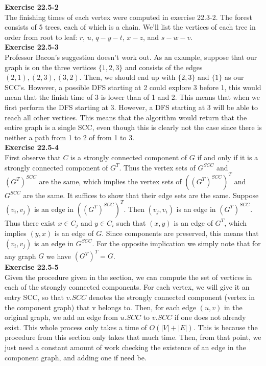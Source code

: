 \documentclass{article}
\begin{document}
\noindent\textbf{Exercise 22.5-2}\\

The finishing times of each vertex were computed in exercise 22.3-2.  The forest consists of 5 trees, each of which is a chain.  We'll list the vertices of each tree in order from root to leaf: $r$, $u$, $q-y-t$, $x-z$, and $s-w-v$.\\

\noindent\textbf{Exercise 22.5-3}\\

Professor Bacon's suggestion doesn't work out. As an example, suppose that our graph is on the three vertices $\{1,2,3\}$ and consists of the edges $(2,1),(2,3),(3,2)$. Then, we should end up with $\{2,3\}$ and $\{1\}$ as our SCC's. However, a possible DFS starting at 2 could explore 3 before 1, this would mean that the finish time of 3 is lower than of 1 and 2. This means that when we first perform the DFS starting at 3. However, a DFS starting at 3 will be able to reach all other vertices. This means that the algorithm would return that the entire graph is a single SCC, even though this is clearly not the case since there is neither a path from 1 to 2 of from 1 to 3.\\

\noindent\textbf{Exercise 22.5-4}\\

First observe that $C$ is a strongly connected component of $G$ if and only if it is a strongly connected component of $G^T$.  Thus the vertex sets of $G^{SCC}$ and $(G^{T})^{SCC}$ are the same, which implies the vertex sets of $((G^T)^{SCC})^T$ and $G^{SCC}$ are the same.  It suffices to show that their edge sets are the same.  Suppose $(v_i, v_j)$ is an edge in $((G^T)^{SCC})^T$.  Then $(v_j, v_i)$ is an edge in $(G^{T})^{SCC}$.  Thus there exist $x \in C_j$ and $y \in C_i$ such that $(x,y)$ is an edge of $G^T$, which implies $(y,x)$ is an edge of $G$.  Since components are preserved, this means that $(v_i, v_j)$ is an edge in $G^{SCC}$.  For the opposite implication we simply note that for any graph $G$ we have $(G^T)^T = G$. \\

\noindent\textbf{Exercise 22.5-5}\\

Given the procedure given in the section, we can compute the set of vertices in each of the strongly connected components. For each vertex, we will give it an entry SCC, so that $v.SCC$ denotes the strongly connected component (vertex in the component graph) that v belongs to. Then, for each edge $(u,v)$ in the original graph, we add an edge from $u.SCC$ to $v.SCC$ if one does not already exist. This whole process only takes a time of $O(|V|+|E|)$. This is because the procedure from this section only takes that much time. Then, from that point, we just need a constant amount of work checking the existence of an edge in the component graph, and adding one if need be.\\
\end{document}
